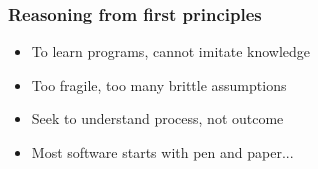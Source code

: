 \documentclass{beamer}
\begin{document}
    \begin{frame}
        \frametitle{Reasoning from first principles}
        \begin{itemize}
            \item To learn programs, cannot imitate knowledge
            \item Too fragile, too many brittle assumptions
            \item Seek to understand process, not outcome
            \item Most software starts with pen and paper...
        \end{itemize}
        \begin{figure}[H]
            \centering


        \end{figure}
    \end{frame}
\end{document}
